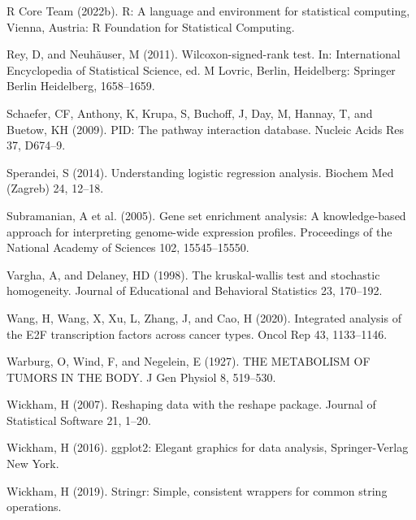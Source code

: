 \documentclass[
  parskip,
  openany]{scrreprt}
\newlength{\cslhangindent}
\newlength{\cslentryspacingunit} %
\newenvironment{CSLReferences}[2] %
 {%
  \setlength{\parindent}{0pt}
  \ifodd #1
  \let\oldpar\par
  \def\par{\hangindent=\cslhangindent\oldpar}
  \fi
  \setlength{\parskip}{#2\cslentryspacingunit}
 }%
 {}
\begin{document}
\begin{CSLReferences}{0}{0}
\leavevmode{}%
R Core Team (2022b). R: A language and environment for statistical
computing, Vienna, Austria: R Foundation for Statistical Computing.

\leavevmode{}%
Rey, D, and Neuhäuser, M (2011). Wilcoxon-signed-rank test. In:
International Encyclopedia of Statistical Science, ed. M Lovric, Berlin,
Heidelberg: Springer Berlin Heidelberg, 1658--1659.

\leavevmode{}%
Schaefer, CF, Anthony, K, Krupa, S, Buchoff, J, Day, M, Hannay, T, and
Buetow, KH (2009). PID: The pathway interaction database. Nucleic Acids
Res 37, D674--9.

\leavevmode{}%
Sperandei, S (2014). Understanding logistic regression analysis. Biochem
Med (Zagreb) 24, 12--18.

\leavevmode{}%
Subramanian, A et al. (2005). Gene set enrichment analysis: A
knowledge-based approach for interpreting genome-wide expression
profiles. Proceedings of the National Academy of Sciences 102,
15545--15550.

\leavevmode{}%
Vargha, A, and Delaney, HD (1998). The kruskal-wallis test and
stochastic homogeneity. Journal of Educational and Behavioral Statistics
23, 170--192.

\leavevmode{}%
Wang, H, Wang, X, Xu, L, Zhang, J, and Cao, H (2020). Integrated
analysis of the E2F transcription factors across cancer types. Oncol Rep
43, 1133--1146.

\leavevmode{}%
Warburg, O, Wind, F, and Negelein, E (1927). THE METABOLISM OF TUMORS IN
THE BODY. J Gen Physiol 8, 519--530.

\leavevmode{}%
Wickham, H (2007). Reshaping data with the {reshape} package. Journal of
Statistical Software 21, 1--20.

\leavevmode{}%
Wickham, H (2016). ggplot2: Elegant graphics for data analysis,
Springer-Verlag New York.

\leavevmode{}%
Wickham, H (2019). Stringr: Simple, consistent wrappers for common
string operations.


\end{CSLReferences}
\end{document}
